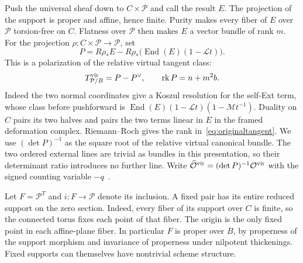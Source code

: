 Push the universal sheaf down to \(C\times\mathcal P\) and call the result
\(E\). The projection of the support is proper and affine, hence finite.
Purity makes every fiber of \(E\) over \(\mathcal P\) torsion-free on \(C\).
Flatness over \(\mathcal P\) then makes \(E\) a vector bundle of rank \(m\).
For the projection \(\rho:C\times\mathcal P\to\mathcal P\), set
\begin{equation}
 P=R\rho_*E-
 R\rho_*\bigl(\operatorname{End}(E)(1-\mathcal L t)\bigr).
 \label{eq:originalpolarization}
\end{equation}
This is a polarization of the relative virtual tangent class:
\begin{equation}
 T^{\rm vir}_{\mathcal P/B}=P-P^\vee,\qquad
 \operatorname{rk}P=n+m^2b .
 \label{eq:originaltangent}
\end{equation}
Indeed the two normal coordinates give a Koszul resolution for the
self-Ext term, whose class before pushforward is
\(\operatorname{End}(E)(1-\mathcal Lt)(1-\mathcal M t^{-1})\).
Duality on \(C\) pairs its two halves and pairs the two terms linear in
\(E\) in the framed deformation complex. Riemann--Roch gives the rank
in~\eqref{eq:originaltangent}. We use \((\det P)^{-1}\) as the square
root of the relative virtual canonical bundle. The two ordered external
lines are trivial as bundles in this presentation, so their determinant
ratio introduces no further line. Write
\(\widehat{\mathcal O}^{\rm vir}=(\det P)^{-1}\mathcal O^{\rm vir}\)
with the signed counting variable \(-q\)~\cite{no}.

Let \(F=\mathcal P^T\) and \(i:F\to\mathcal P\) denote its inclusion.
A fixed pair has its entire reduced support on the zero section. Indeed,
every fiber of its support over \(C\) is finite, so the connected torus
fixes each point of that fiber. The origin is the only fixed point in
each affine-plane fiber. In particular \(F\) is proper over \(B\),
by properness of the support morphism and invariance of properness
under nilpotent thickenings. Fixed supports can themselves have
nontrivial scheme structure.

